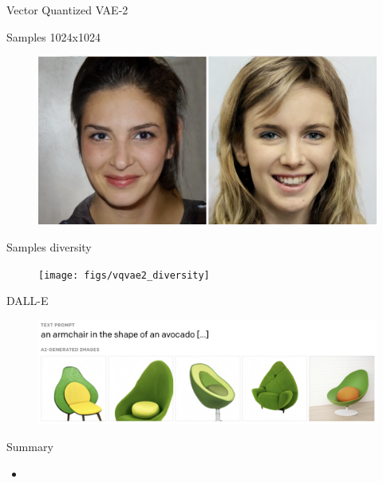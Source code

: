 \begin{frame}{Vector Quantized VAE-2}
	\begin{block}{Samples 1024x1024}
		\vspace{-0.2cm}
		\begin{figure}
			\centering
			\includegraphics[width=0.63\linewidth]{figs/vqvae2_faces}
		\end{figure}
	\end{block}
	\vspace{-0.6cm}
	\begin{block}{Samples diversity}
		\vspace{-0.2cm}
		\begin{figure}
			\centering
			\texttt{[image: figs/vqvae2\_diversity]}
		\end{figure}
	\end{block}
\end{frame}
\begin{frame}{DALL-E}
	\begin{figure}
		\includegraphics[width=\linewidth]{figs/dalle}
	\end{figure}
\end{frame}
\begin{frame}{Summary}
	\begin{itemize}
	\item 
	\end{itemize}
\end{frame}
 